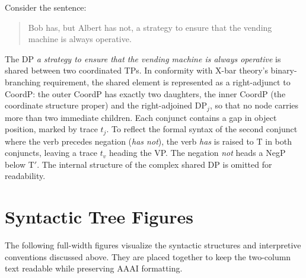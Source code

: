 \documentclass[letterpaper]{article}
\begin{document}
\begin{example}
Consider the sentence:
\begin{quote}
  Bob has, but Albert has not, a strategy to ensure that the vending machine
  is always operative.
\end{quote}
The DP \emph{a strategy to ensure that the vending machine is always operative}
is shared between two coordinated TPs.
In conformity with X-bar theory's binary-branching requirement,
the shared element is represented as a right-adjunct to CoordP:
the outer CoordP has exactly two daughters, the inner CoordP
(the coordinate structure proper) and the right-adjoined $\mathrm{DP}_j$,
so that no node carries more than two immediate children.
Each conjunct contains a gap in object position, marked by trace $t_j$.
To reflect the formal syntax of the second conjunct where the verb precedes negation (\emph{has not}), the verb \emph{has} is raised to T in both conjuncts, leaving a trace $t_v$ heading the VP. 
The negation \emph{not} heads a NegP below T$'$.
The internal structure of the complex shared DP is omitted for readability.
\end{example}
 

\section{Syntactic Tree Figures}
The following full-width figures visualize the syntactic structures and interpretive conventions discussed above. They are placed together to keep the two-column text readable while preserving AAAI formatting.
\end{document}
